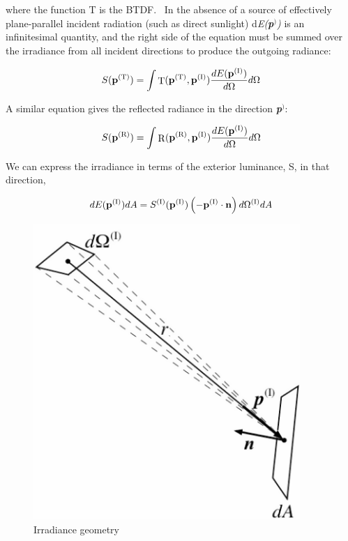 where the function T is the BTDF.~ In the absence of a source of effectively plane-parallel incident radiation (such as direct sunlight) d\emph{E(\textbf{p}}\(^{)}\)\emph{)} is an infinitesimal quantity, and the right side of the equation must be summed over the irradiance from all incident directions to produce the outgoing radiance:

\begin{equation}
S({{\bf{p}}^{{\rm{(T)}}}}) = \int {{\mathop{\rm T}\nolimits} ({{\bf{p}}^{{\rm{(T)}}}},{{\bf{p}}^{{\rm{(I)}}}})\frac{{dE({{\bf{p}}^{{\rm{(I)}}}})}}{{d\Omega }}d\Omega }
\end{equation}

A similar equation gives the reflected radiance in the direction \textbf{\emph{p}}\(^{)}\):

\begin{equation}
S({{\bf{p}}^{{\rm{(R)}}}}) = \int {{\mathop{\rm R}\nolimits} ({{\bf{p}}^{{\rm{(R)}}}},{{\bf{p}}^{{\rm{(I)}}}})\frac{{dE({{\bf{p}}^{{\rm{(I)}}}})}}{{d\Omega }}d\Omega }
\end{equation}

We can express the irradiance in terms of the exterior luminance, S, in that direction,

\begin{equation}
dE({{\bf{p}}^{{\rm{(I)}}}})dA = {S^{{\rm{(I)}}}}({{\bf{p}}^{{\rm{(I)}}}})\left( { - {{\bf{p}}^{{\rm{(I)}}}}\cdot {\bf{n}}} \right)d{\Omega ^{{\rm{(I)}}}}dA
\end{equation}

\begin{figure}[hbtp] %
\centering
\includegraphics[width=0.9\textwidth, height=0.9\textheight, keepaspectratio=true]{media/image1271.png}
\caption{Irradiance geometry \protect \label{fig:irradiance-geometry}}
\end{figure}

